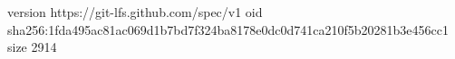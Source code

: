 version https://git-lfs.github.com/spec/v1
oid sha256:1fda495ac81ac069d1b7bd7f324ba8178e0dc0d741ca210f5b20281b3e456cc1
size 2914
